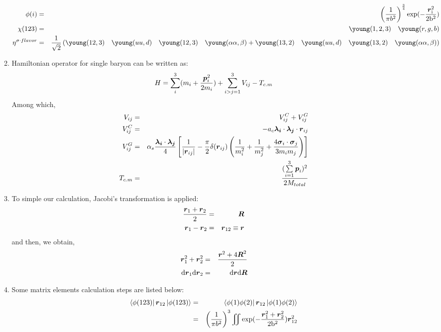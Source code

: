 \documentclass[11pt]{article}
\newcommand{\bm}[1]{\mbox{\boldmath{$#1$}}}
\begin{document}
\begin{enumerate}
\begin{enumerate}
\begin{eqnarray}
\phi(i)&=&\left(\frac{1}{\pi{}b^{2}}\right)^{\frac{3}{4}}\rm{exp}(-\frac{\bm{r}_{i}^2}{2b^2})\\
\chi(123)&=&\young(1,2,3)\quad\young(r,g,b)\\
\eta^{\sigma\cdot{}flavor}&=&\frac{1}{\sqrt{2}}\left(\young(12,3)\quad
\young(uu,d)\quad\young(12,3)\quad\young(\alpha\alpha,\beta)
+\young(13,2)\quad\young(uu,d)\quad\young(13,2)\quad\young(\alpha\alpha,\beta)\right)
\end{eqnarray}
\item Hamiltonian operator for single baryon can be written as:
\begin{equation}
H = \sum_{i}^{3}(m_i+\frac{\bm{p}^{2}_{i}}{2m_i})+\sum_{i>j=1}^{3}V_{i j}-T_{c.m}
\end{equation}
Among which,\\
\begin{eqnarray}
V_{i j} & = & V_{i j}^C + V_{i j}^G\\
V_{i j}^C & = & -a_c\bm{\lambda_i}\cdot\bm{\lambda_j}\cdot\bm{r}_{i j}\\
V_{i j}^G & = & \alpha_s\frac{\bm{\lambda_i}\cdot\bm{\lambda_j}}{4}\left[\frac{1}
{|\bm{r}_{i j}|}-\frac{\pi}{2}\delta(\bm{r}_{i j})\left(\frac{1}{m_{i}^2}+\frac{1}{m_{j}^2}
+ \frac{4\bm{\sigma}_i\cdot\bm{\sigma}_j}{3m_{i}m_{j}}\right)\right]\\
T_{c.m} & = & \frac{(\sum\limits_{i=1}^{3}\bm{p}_{i})^{2}}{2M_{total}}
\end{eqnarray}
\item To simple our calculation, Jacobi's transformation is applied:
\begin{eqnarray}
\frac{\bm{r}_1+\bm{r}_2}{2}&=&\bm{R}\\
\bm{r}_1-\bm{r}_2&=&\bm{r}_{1 2}\equiv\bm{r}
\end{eqnarray}
and then, we obtain,\\
\begin{eqnarray}
\bm{r}_{1}^{2}+\bm{r}_{2}^{2}&=&\frac{\bm{r}^2+4\bm{R}^2}{2}\\
{\rm d}\bm{r}_1{}{\rm d}\bm{r}_2&=&{\rm d}\bm{r}{\rm d}\bm{R}
\end{eqnarray}
\item Some matrix elements calculation steps are listed below:
\begin{eqnarray}
\bra{\phi(123)}\bm{r}_{1 2}\ket{\phi(123)}&=&\bra{\phi(1)\phi(2)}\bm{r}_{1 2}\ket{\phi(1)\phi(2)}\nonumber\\
& = & \left(\frac{1}{\pi{}b^2}\right)^3\iint{}\rm{exp}(-\frac{\bm{r}_{1}^2+\bm{r}_{2}^2}{2b^2})\bm{r}_{1 2}^2

\end{eqnarray}
\end{enumerate}
\end{enumerate}
\end{document}
